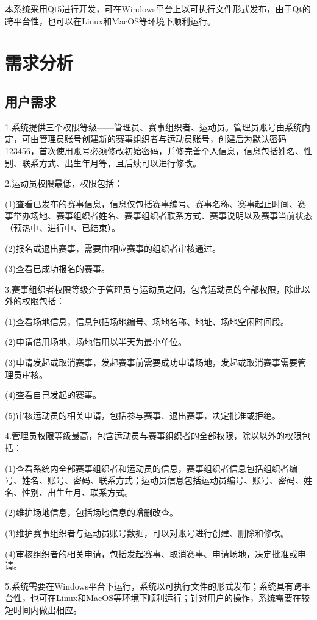 \documentclass[a4paper,UTF8]{article}
\begin{document}
本系统采用Qt5进行开发，可在Windows平台上以可执行文件形式发布，由于Qt的跨平台性，也可以在Linux和MacOS等环境下顺利运行。

\section{需求分析}
\subsection{用户需求}
1.系统提供三个权限等级——管理员、赛事组织者、运动员。管理员账号由系统内定，可由管理员账号创建新的赛事组织者与运动员账号，创建后为默认密码123456，首次使用账号必须修改初始密码，并修完善个人信息，信息包括姓名、性别、联系方式、出生年月等，且后续可以进行修改。

2.运动员权限最低，权限包括：

(1)查看已发布的赛事信息，信息仅包括赛事编号、赛事名称、赛事起止时间、赛事举办场地、赛事组织者姓名、赛事组织者联系方式、赛事说明以及赛事当前状态（预热中、进行中、已结束）。

(2)报名或退出赛事，需要由相应赛事的组织者审核通过。

(3)查看已成功报名的赛事。

3.赛事组织者权限等级介于管理员与运动员之间，包含运动员的全部权限，除此以外的权限包括：

(1)查看场地信息，信息包括场地编号、场地名称、地址、场地空闲时间段。

(2)申请借用场地，场地借用以半天为最小单位。

(3)申请发起或取消赛事，发起赛事前需要成功申请场地，发起或取消赛事需要管理员审核。

(4)查看自己发起的赛事。

(5)审核运动员的相关申请，包括参与赛事、退出赛事，决定批准或拒绝。

4.管理员权限等级最高，包含运动员与赛事组织者的全部权限，除以以外的权限包括：

(1)查看系统内全部赛事组织者和运动员的信息，赛事组织者信息包括组织者编号、姓名、账号、密码、联系方式；运动员信息包括运动员编号、账号、密码、姓名、性别、出生年月、联系方式。

(2)维护场地信息，包括场地信息的增删改查。

(3)维护赛事组织者与运动员账号数据，可以对账号进行创建、删除和修改。

(4)审核组织者的相关申请，包括发起赛事、取消赛事、申请场地，决定批准或申请。


5.系统需要在Windows平台下运行，系统以可执行文件的形式发布；系统具有跨平台性，也可在Linux和MacOS等环境下顺利运行；针对用户的操作，系统需要在较短时间内做出相应。
\end{document}

